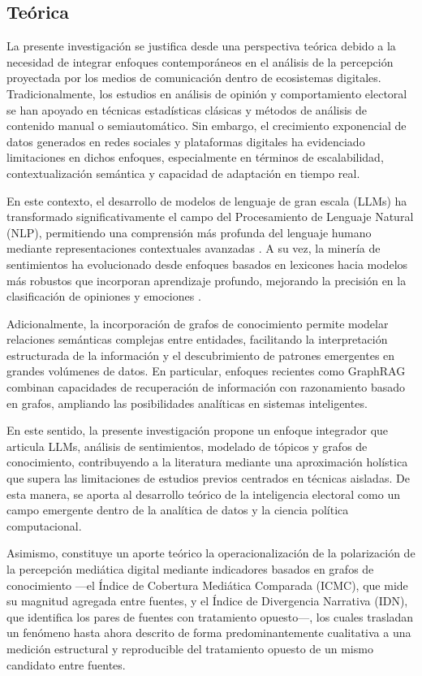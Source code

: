 \subsection{Teórica}

La presente investigación se justifica desde una perspectiva teórica debido a la necesidad de integrar enfoques contemporáneos en el análisis de la percepción proyectada por los medios de comunicación dentro de ecosistemas digitales. Tradicionalmente, los estudios en análisis de opinión y comportamiento electoral se han apoyado en técnicas estadísticas clásicas y métodos de análisis de contenido manual o semiautomático. Sin embargo, el crecimiento exponencial de datos generados en redes sociales y plataformas digitales ha evidenciado limitaciones en dichos enfoques, especialmente en términos de escalabilidad, contextualización semántica y capacidad de adaptación en tiempo real.

En este contexto, el desarrollo de modelos de lenguaje de gran escala (LLMs) ha transformado significativamente el campo del Procesamiento de Lenguaje Natural (NLP), permitiendo una comprensión más profunda del lenguaje humano mediante representaciones contextuales avanzadas \parencite{tec_devlin2018bert, tec_brown2020gpt3}. A su vez, la minería de sentimientos ha evolucionado desde enfoques basados en lexicones hacia modelos más robustos que incorporan aprendizaje profundo, mejorando la precisión en la clasificación de opiniones y emociones \parencite{pr_pang2008opinion}.

Adicionalmente, la incorporación de grafos de conocimiento permite modelar relaciones semánticas complejas entre entidades, facilitando la interpretación estructurada de la información y el descubrimiento de patrones emergentes en grandes volúmenes de datos. En particular, enfoques recientes como GraphRAG combinan capacidades de recuperación de información con razonamiento basado en grafos, ampliando las posibilidades analíticas en sistemas inteligentes.

En este sentido, la presente investigación propone un enfoque integrador que articula LLMs, análisis de sentimientos, modelado de tópicos y grafos de conocimiento, contribuyendo a la literatura mediante una aproximación holística que supera las limitaciones de estudios previos centrados en técnicas aisladas. De esta manera, se aporta al desarrollo teórico de la inteligencia electoral como un campo emergente dentro de la analítica de datos y la ciencia política computacional.

Asimismo, constituye un aporte teórico la operacionalización de la polarización de la percepción mediática digital mediante indicadores basados en grafos de conocimiento —el Índice de Cobertura Mediática Comparada (ICMC), que mide su magnitud agregada entre fuentes, y el Índice de Divergencia Narrativa (IDN), que identifica los pares de fuentes con tratamiento opuesto—, los cuales trasladan un fenómeno hasta ahora descrito de forma predominantemente cualitativa a una medición estructural y reproducible del tratamiento opuesto de un mismo candidato entre fuentes.

